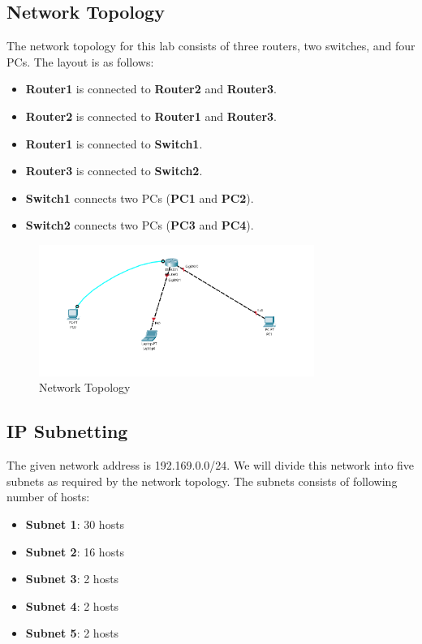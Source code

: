 \documentclass[a4paper,12pt]{article}
\begin{document}
\subsection{Network Topology}
The network topology for this lab consists of three routers, two switches, and four PCs. The layout is as follows:
\begin{itemize}
    \item \textbf{Router1} is connected to \textbf{Router2} and \textbf{Router3}.
    \item \textbf{Router2} is connected to \textbf{Router1} and \textbf{Router3}.
    \item \textbf{Router1} is connected to \textbf{Switch1}.
    \item \textbf{Router3} is connected to \textbf{Switch2}.
    \item \textbf{Switch1} connects two PCs (\textbf{PC1} and \textbf{PC2}).
    \item \textbf{Switch2} connects two PCs (\textbf{PC3} and \textbf{PC4}).
\end{itemize}

\begin{figure}[h!]
    \centering
    \includegraphics[width=0.8\textwidth]{img/topology.png}
    \caption{Network Topology}
\end{figure}

\subsection*{IP Subnetting}
The given network address is 192.169.0.0/24. We will divide this network into five subnets as required by the network topology. The subnets consists of following number of hosts:
\begin{itemize}
    \item \textbf{Subnet 1}: 30 hosts
    \item \textbf{Subnet 2}: 16 hosts
    \item \textbf{Subnet 3}: 2 hosts
    \item \textbf{Subnet 4}: 2 hosts
    \item \textbf{Subnet 5}: 2 hosts
\end{itemize}
\end{document}

